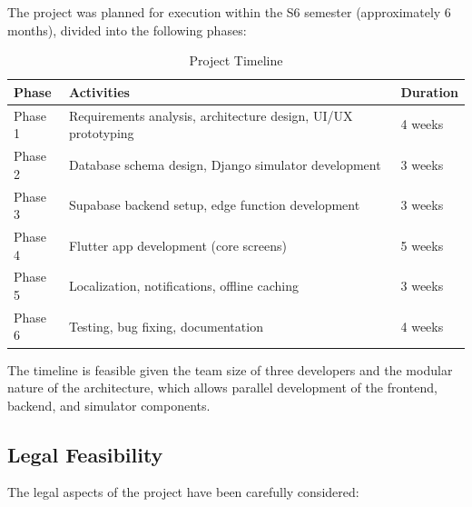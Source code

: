 The project was planned for execution within the S6 semester (approximately 6 months), divided into the following phases:

\begin{table}[H]
\centering
\caption{Project Timeline}
\begin{tabularx}{\textwidth}{|l|X|l|}
\hline
\textbf{Phase} & \textbf{Activities} & \textbf{Duration} \\
\hline
Phase 1 & Requirements analysis, architecture design, UI/UX prototyping & 4 weeks \\
\hline
Phase 2 & Database schema design, Django simulator development & 3 weeks \\
\hline
Phase 3 & Supabase backend setup, edge function development & 3 weeks \\
\hline
Phase 4 & Flutter app development (core screens) & 5 weeks \\
\hline
Phase 5 & Localization, notifications, offline caching & 3 weeks \\
\hline
Phase 6 & Testing, bug fixing, documentation & 4 weeks \\
\hline
\end{tabularx}
\end{table}

The timeline is feasible given the team size of three developers and the modular nature of the architecture, which allows parallel development of the frontend, backend, and simulator components.

\subsection{Legal Feasibility}

The legal aspects of the project have been carefully considered:

